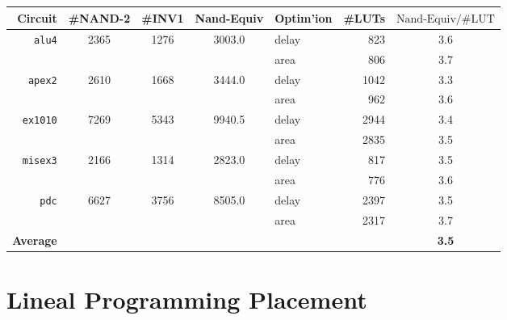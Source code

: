 \documentclass[12pt]{article}
\begin{document}
\section{}
\begin{table}[H]\centering\begin{tabular}{ r *3c || l  r | c }
\hline\hline
Circuit & \#NAND-2 & \#INV1 & Nand-Equiv & Optim'ion & \#LUTs & \({\text{Nand-Equiv}}/{\text{\#LUT}}\) \\
\hline
\texttt{alu4}   & 2365 & 1276 & 3003.0 & delay &  823 &  3.6 \\
                &      &      &        & area  &  806 &  3.7 \\
\texttt{apex2}  & 2610 & 1668 & 3444.0 & delay & 1042 &  3.3 \\
                &      &      &        & area  &  962 &  3.6 \\
\texttt{ex1010} & 7269 & 5343 & 9940.5 & delay & 2944 &  3.4 \\
                &      &      &        & area  & 2835 &  3.5 \\
\texttt{misex3} & 2166 & 1314 & 2823.0 & delay &  817 &  3.5 \\
                &      &      &        & area  &  776 &  3.6 \\
\texttt{pdc}    & 6627 & 3756 & 8505.0 & delay & 2397 &  3.5 \\
                &      &      &        & area  & 2317 &  3.7 \\
\hline
\textbf{Average}&      &      &        &       &      & \textbf{3.5} \\
\hline\hline
\end{tabular}\caption{}\label{tab:nand-equiv}\end{table}

\part{Lineal Programming Placement}
\section{}
\end{document}
